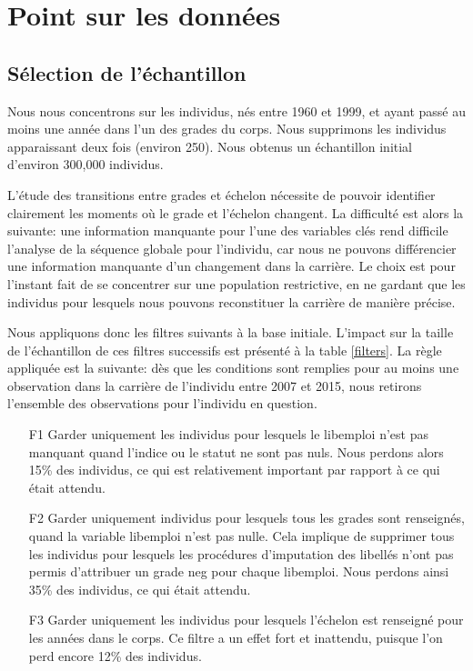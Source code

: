 \documentclass[11pt,a4paper]{article}
\begin{document}
\clearpage





\section{Point sur les données} \label{data}


\subsection{Sélection de l'échantillon}

Nous nous concentrons sur les individus, nés entre 1960 et 1999, et ayant passé au moins une année dans l'un des grades du corps. Nous supprimons les individus apparaissant deux fois (environ 250). Nous obtenus un échantillon initial d'environ 300,000 individus. 

L'étude des transitions entre grades et échelon nécessite de pouvoir identifier clairement les moments où le grade et l'échelon changent. La difficulté est alors la suivante: une information manquante pour l'une des variables clés rend difficile l'analyse de la séquence globale pour l'individu, car nous ne pouvons différencier une information manquante d'un changement dans la carrière. Le choix est pour l'instant fait de se concentrer sur une population restrictive, en ne gardant que les individus pour lesquels nous pouvons reconstituer la carrière de manière précise. 

Nous appliquons donc les filtres suivants à la base initiale. L'impact sur la taille de l'échantillon de ces filtres successifs est présenté à la table \ref{filters}. La règle appliquée est la suivante: dès que les conditions sont remplies pour au moins une observation dans la carrière de l'individu entre 2007 et 2015, nous retirons l'ensemble des observations pour l'individu en question. 
\begin{enumerate}[leftmargin=1cm ,parsep=0cm,itemsep=0cm,topsep=0cm] 
\item[F1] Garder uniquement les individus pour lesquels le libemploi n'est pas manquant quand l'indice ou le statut ne sont pas nuls. Nous perdons alors 15\% des individus, ce qui est relativement important par rapport à ce qui était attendu. 
\item[F2] Garder uniquement individus pour lesquels tous les grades sont renseignés, quand la variable libemploi n'est pas nulle. Cela implique de supprimer tous les individus pour lesquels les procédures d'imputation des libellés n'ont pas permis d'attribuer un grade neg pour chaque libemploi. Nous perdons ainsi 35\% des individus, ce qui était attendu. 
\item[F3] Garder uniquement les individus pour lesquels l'échelon est renseigné pour les années dans le corps. Ce filtre a un effet fort et inattendu, puisque l'on perd encore 12\% des individus. 
\end{enumerate}
\end{document}

